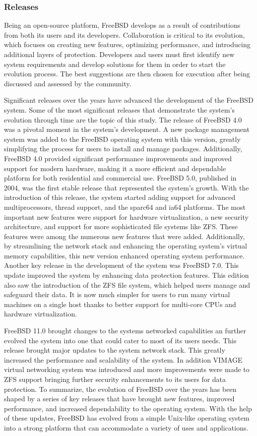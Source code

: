 \documentclass[12pt, dvipsnames, a4paper]{article}
\begin{document}
\subsubsection{Releases}
Being an open-source platform, FreeBSD develops as a result of contributions from both its users and its developers. Collaboration is critical to its evolution, which focuses on creating new features, optimizing performance, and introducing additional layers of protection. Developers and users must first identify new system requirements and develop solutions for them in order to start the evolution process. The best suggestions are then chosen for execution after being discussed and assessed by the community.

Significant releases over the years have advanced the development of the FreeBSD system. Some of the most significant releases that demonstrate the system's evolution through time are the topic of this study.
The release of FreeBSD 4.0 was a pivotal moment in the system's development. A new package management system was added to the FreeBSD operating system with this version, greatly simplifying the process for users to install and manage packages. Additionally, FreeBSD 4.0 provided significant performance improvements and improved support for modern hardware, making it a more efficient and dependable platform for both residential and commercial use.
FreeBSD 5.0, published in 2004, was the first stable release that represented the system's growth. With the introduction of this release, the system started adding support for advanced multiprocessors, thread support, and the sparc64 and ia64 platforms. The most important new features were support for hardware virtualization, a new security architecture, and support for more sophisticated file systems like ZFS. These features were among the numerous new features that were added. Additionally, by streamlining the network stack and enhancing the operating system's virtual memory capabilities, this new version enhanced operating system performance.
Another key release in the development of the system was FreeBSD 7.0. This update improved the system by enhancing data protection features. This edition also saw the introduction of the ZFS file system, which helped users manage and safeguard their data. It is now much simpler for users to run many virtual machines on a single host thanks to better support for multi-core CPUs and hardware virtualization.


FreeBSD 11.0 brought changes to the systems networked capabilities an further evolved the system into one that could cater to most of its users needs. This release brought major updates to the system network stack. This greatly increased the performance and scalability of the system. In addition VIMAGE virtual networking system was introduced and more improvements were made to ZFS support bringing further security enhancements to its users for data protection.
To summarize, the evolution of FreeBSD over the years has been shaped by a series of key releases that have brought new features, improved performance, and increased dependability to the operating system. With the help of these updates, FreeBSD has evolved from a simple Unix-like operating system into a strong platform that can accommodate a variety of uses and applications.
\end{document}
